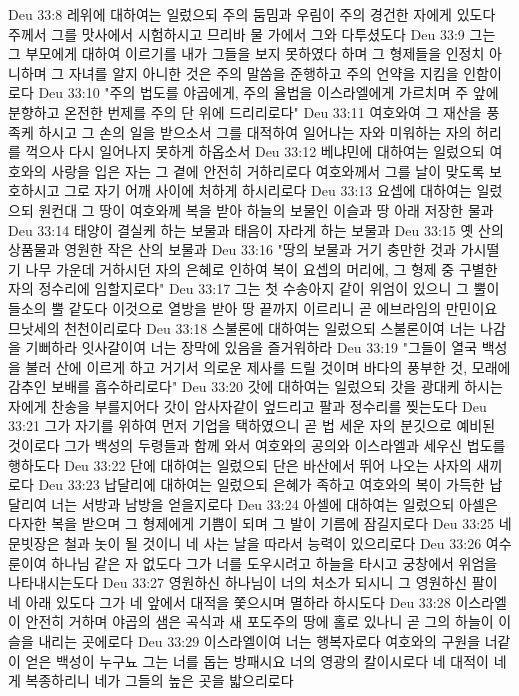 Deu 33:8  레위에 대하여는 일렀으되 주의 둠밈과 우림이 주의 경건한 자에게 있도다 주께서 그를 맛사에서 시험하시고 므리바 물 가에서 그와 다투셨도다
Deu 33:9  그는 그 부모에게 대하여 이르기를 내가 그들을 보지 못하였다 하며 그 형제들을 인정치 아니하며 그 자녀를 알지 아니한 것은 주의 말씀을 준행하고 주의 언약을 지킴을 인함이로다
Deu 33:10  "주의 법도를 야곱에게, 주의 율법을 이스라엘에게 가르치며 주 앞에 분향하고 온전한 번제를 주의 단 위에 드리리로다"
Deu 33:11  여호와여 그 재산을 풍족케 하시고 그 손의 일을 받으소서 그를 대적하여 일어나는 자와 미워하는 자의 허리를 꺽으사 다시 일어나지 못하게 하옵소서
Deu 33:12  베냐민에 대하여는 일렀으되 여호와의 사랑을 입은 자는 그 곁에 안전히 거하리로다 여호와께서 그를 날이 맞도록 보호하시고 그로 자기 어깨 사이에 처하게 하시리로다
Deu 33:13  요셉에 대하여는 일렀으되 원컨대 그 땅이 여호와께 복을 받아 하늘의 보물인 이슬과 땅 아래 저장한 물과
Deu 33:14  태양이 결실케 하는 보물과 태음이 자라게 하는 보물과
Deu 33:15  옛 산의 상품물과 영원한 작은 산의 보물과
Deu 33:16  "땅의 보물과 거기 충만한 것과 가시떨기 나무 가운데 거하시던 자의 은혜로 인하여 복이 요셉의 머리에, 그 형제 중 구별한 자의 정수리에 임할지로다"
Deu 33:17  그는 첫 수송아지 같이 위엄이 있으니 그 뿔이 들소의 뿔 같도다 이것으로 열방을 받아 땅 끝까지 이르리니 곧 에브라임의 만민이요 므낫세의 천천이리로다
Deu 33:18  스불론에 대하여는 일렀으되 스불론이여 너는 나감을 기뻐하라 잇사갈이여 너는 장막에 있음을 즐거워하라
Deu 33:19  "그들이 열국 백성을 불러 산에 이르게 하고 거기서 의로운 제사를 드릴 것이며 바다의 풍부한 것, 모래에 감추인 보배를 흡수하리로다"
Deu 33:20  갓에 대하여는 일렀으되 갓을 광대케 하시는 자에게 찬송을 부를지어다 갓이 암사자같이 엎드리고 팔과 정수리를 찢는도다
Deu 33:21  그가 자기를 위하여 먼저 기업을 택하였으니 곧 법 세운 자의 분깃으로 예비된 것이로다 그가 백성의 두령들과 함께 와서 여호와의 공의와 이스라엘과 세우신 법도를 행하도다
Deu 33:22  단에 대하여는 일렀으되 단은 바산에서 뛰어 나오는 사자의 새끼로다
Deu 33:23  납달리에 대하여는 일렀으되 은혜가 족하고 여호와의 복이 가득한 납달리여 너는 서방과 남방을 얻을지로다
Deu 33:24  아셀에 대하여는 일렀으되 아셀은 다자한 복을 받으며 그 형제에게 기쁨이 되며 그 발이 기름에 잠길지로다
Deu 33:25  네 문빗장은 철과 놋이 될 것이니 네 사는 날을 따라서 능력이 있으리로다
Deu 33:26  여수룬이여 하나님 같은 자 없도다 그가 너를 도우시려고 하늘을 타시고 궁창에서 위엄을 나타내시는도다
Deu 33:27  영원하신 하나님이 너의 처소가 되시니 그 영원하신 팔이 네 아래 있도다 그가 네 앞에서 대적을 쫓으시며 멸하라 하시도다
Deu 33:28  이스라엘이 안전히 거하며 야곱의 샘은 곡식과 새 포도주의 땅에 홀로 있나니 곧 그의 하늘이 이슬을 내리는 곳에로다
Deu 33:29  이스라엘이여 너는 행복자로다 여호와의 구원을 너같이 얻은 백성이 누구뇨 그는 너를 돕는 방패시요 너의 영광의 칼이시로다 네 대적이 네게 복종하리니 네가 그들의 높은 곳을 밟으리로다
